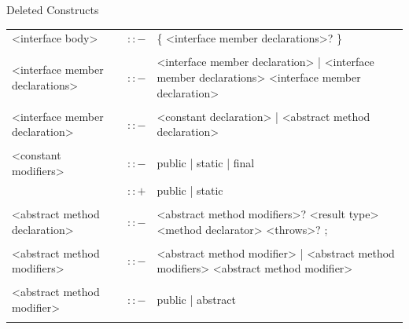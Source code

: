 \documentclass[landscape, 11pt]{article}
\begin{document}
\begin{qsection}{Deleted Constructs}
\begin{enumerate}[label=\bt{\theenumi.}]
\begin{longtable}{R{7cm} c L{15cm}}
				<interface body>							&	$\colon\colon-$	&	\{ <interface member declarations>? \} \\\\
				<interface member declarations>				&	$\colon\colon-$	&	<interface member declaration> | <interface member declarations> <interface member declaration> \\\\
				<interface member declaration>				&	$\colon\colon-$	&	<constant declaration> | <abstract method declaration> \\\\
				<constant modifiers>						&	$\colon\colon-$	&	public | static | final \\
															&	$\colon\colon+$	&	public | static \\\\
				<abstract method declaration>				&	$\colon\colon-$	&	<abstract method modifiers>? <result type> <method declarator> <throws>? ; \\\\
				<abstract method modifiers>					&	$\colon\colon-$	&	<abstract method modifier> | <abstract method modifiers> <abstract method modifier> \\\\
				<abstract method modifier>					&	$\colon\colon-$	&	public | abstract \\\\
			\end{longtable}



\end{enumerate}
\end{qsection}
\end{document}
